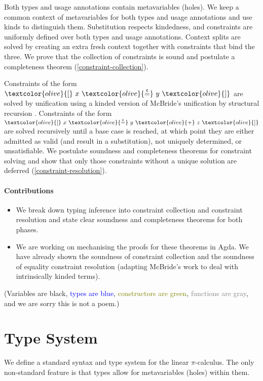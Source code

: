 \documentclass[sigplan,screen,review]{acmart}
\newcommand{\picalc}{$\pi$-calculus}
\newcommand{\constr}[1]{\textcolor{olive}{\mathtt{#1}}}
\newcommand{\eqconstr}[2]{\constr{[} ~ #1 ~ \constr{\stackrel{c}{=}} ~ #2 ~ \constr{]}}
\newcommand{\sumconstr}[3]{\constr{[} ~ #1 ~ \constr{\stackrel{c}{=}} ~ #2 ~ \constr{+} ~ #3 ~ \constr{]}}
\begin{document}
Both types and usage annotations contain metavariables (holes).
We keep a common context of metavariables for both types and usage annotations and use kinds to distinguish them.
Substitution respects kindedness, and constraints are uniformly defined over both types and usage annotations.
Context splits are solved by creating an extra fresh context together with constraints that bind the three.
We prove that the collection of constraints is sound and postulate a completeness theorem (\autoref{constraint-collection}).

Constraints of the form $\eqconstr{x}{y}$ are solved by unification using a kinded version of McBride's unification by structural recursion \cite{McBride03}.
Constraints of the form $\sumconstr{x}{y}{z}$ are solved recursively until a base case is reached, at which point they are either admitted as valid (and result in a substitution), not uniquely determined, or unsatisfiable.
We postulate soundness and completeness theorems for constraint solving and show that only those constraints without a unique solution are deferred (\autoref{constraint-resolution}).

\paragraph{Contributions}
\begin{itemize}
  \item We break down typing inference into constraint collection and constraint resolution and state clear soundness and completeness theorems for both phases.
  \item We are working on mechanising the proofs for these theorems in Agda. We have already shown the soundness of constraint collection and the soundness of equality constraint resolution (adapting McBride's work \cite{McBride03} to deal with intrinsically kinded terms).
\end{itemize}

(Variables are black, \textcolor{blue}{types are blue}, \textcolor{olive}{constructors are green}, \textcolor{gray}{functions are gray}, and we are sorry this is not a poem.)


\section{Type System}

We define a standard syntax and type system for the linear \picalc{}.
The only non-standard feature is that types allow for metavariables (holes) within them.
\end{document}
